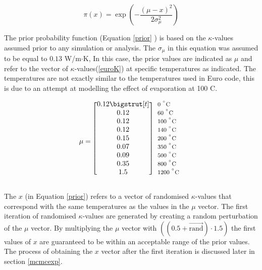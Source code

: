 	\begin{equation}
	\label{prior}
	\pi(x) = \exp\left(-\frac{(\mu - x)^2}{2\sigma_{\mu}^2}\right)
	\end{equation}

	The prior probability function (Equation \ref{prior} ) is based on the $\kappa$-values assumed prior to any simulation or analysis. 
	The $\sigma_{\mu}$ in this equation was assumed to be equal to $0.13$ W/m$\cdot$K,
	In this case, the prior values are indicated as $\mu$ and refer to the vector of $\kappa$-values(\ref{euroK}) at specific temperatures as indicated. The temperatures are not exactly similar to the temperatures used in Euro code, this is due to an attempt at modelling the effect of evaporation at 100 \textdegree C.

\begin{equation}\label{euroK}
  \mu=
  \begin{blockarray}{*{1}{c} l}
    \begin{block}{[*{1}{c}]>{$\footnotesize}l<{$}}
     	0.12\bigstrut[t] & 0 $^{^\circ}\text{C}$\\
		0.12& 60 $^{^\circ}\text{C}$\\ 
		0.12& 100 $^{^\circ}\text{C}$\\ 
		0.12& 140 $^{^\circ}\text{C}$\\ 
		0.15& 200 $^{^\circ}\text{C}$\\ 
		0.07& 350 $^{^\circ}\text{C}$\\
		0.09& 500 $^{^\circ}\text{C}$\\ 
		0.35& 800 $^{^\circ}\text{C}$\\ 
		1.5& 1200 $^{^\circ}\text{C}$\\
    \end{block}
  \end{blockarray}
\end{equation}
	
The $x$ (in Equation \ref{prior}) refers to a vector of randomised $\kappa$-values that correspond with the same temperatures as the values in the $\mu$ vector.
The first iteration of randomised $\kappa$-values are generated by creating a random perturbation of the $\mu$ vector.
By multiplying the $\mu$ vector with $((0.5+\vec{\text{rand}})\cdot1.5)$ the first values of $x$ are guaranteed to be within an acceptable range of the prior values.
The process of obtaining the $x$ vector after the first iteration is discussed later in section \ref{mcmcexp}.


